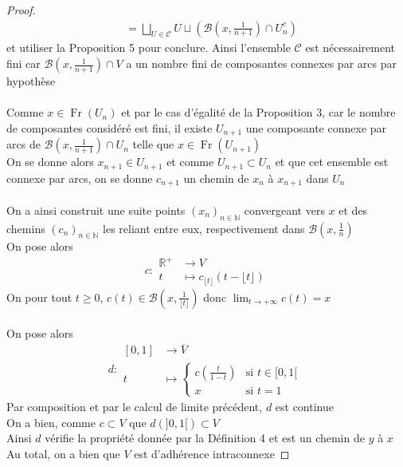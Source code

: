 \documentclass{article}
\begin{document}
\begin{flushleft}
\begin{proof}
\begin{align*}
        &= \bigsqcup_{U \in \mathcal{C}} U \sqcup \left(\mathcal{B}\left(x, \frac{1}{n+1}\right) \cap U_n^c\right)
    \end{align*}
    et utiliser la Proposition 5 pour conclure. Ainsi l'ensemble $\mathcal{C}$ est nécessairement fini car
    $\mathcal{B}(x, \frac{1}{n+1}) \cap V$ a un nombre fini de composantes connexes par arcs par hypothèse
    \\~\\
    Comme $x \in \operatorname{Fr}(U_n)$ et par le cas d'égalité de la Proposition 3, car le nombre de composantes
    considéré est fini, il existe $U_{n+1}$ une composante connexe par arcs de $\mathcal{B}(x, \frac{1}{n+1}) \cap U_n$
    telle que $x \in \operatorname{Fr}(U_{n+1})$\\
    On se donne alors $x_{n+1} \in U_{n+1}$ et comme $U_{n+1} \subset U_n$ et que cet ensemble est connexe par arcs,
    on se donne $c_{n+1}$ un chemin de $x_n$ à $x_{n+1}$ dans $U_n$
    \\~\\
    On a ainsi construit une suite points $(x_n)_{n \in \mathbb{N}}$ convergeant vers $x$ et des chemins
    $(c_n)_{n \in \mathbb{N}}$ les reliant entre eux, respectivement dans $\mathcal{B}(x, \frac{1}{n})$\\
    On pose alors
    \[ c : \begin{array}{cl}
        \mathbb{R}^+ &\longrightarrow V\\
        t &\longmapsto c_{\lfloor t \rfloor}(t - \lfloor t \rfloor)
    \end{array} \]
    On pour tout $t \geq 0$, $c(t) \in \mathcal{B}(x, \frac{1}{\lfloor t \rfloor})$ donc
    $\displaystyle \lim_{t \rightarrow +\infty} c(t) = x$
    \\~\\
    On pose alors
    \[ d : \begin{array}{cl}
        [0, 1] &\longrightarrow \overline{V}\\
        t &\longmapsto \left\{
            \begin{array}{ll}
                c \left( \frac{t}{1-t} \right) &\text{si } t \in [0, 1[\\
                x &\text{si } t = 1
            \end{array} \right.
    \end{array} \]
    Par composition et par le calcul de limite précédent, $d$ est continue\\
    On a bien, comme $c \subset V$ que $d(]0, 1[) \subset V$\\
    Ainsi $d$ vérifie la propriété donnée par la Définition 4 et est un chemin de $y$ à $x$\\
    Au total, on a bien que $V$ est d'adhérence intraconnexe
\end{proof}


\end{flushleft}
\end{document}
